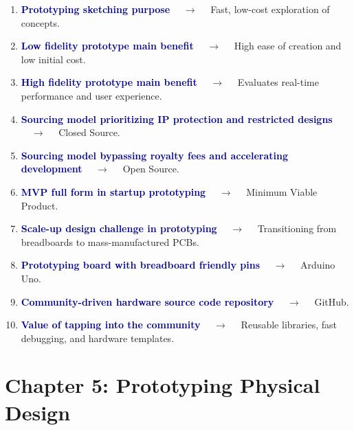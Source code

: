 \documentclass[11pt,a4paper]{article}
\begin{document}
\begin{enumerate}[label=\arabic*., leftmargin=*, labelsep=0.8em, itemsep=0.35em, parsep=0.1em, topsep=0.2em]
  \item \textcolor{darkblue}{\textbf{Prototyping sketching purpose}} $\quad\to\quad$ Fast, low-cost exploration of concepts.
  \item \textcolor{darkblue}{\textbf{Low fidelity prototype main benefit}} $\quad\to\quad$ High ease of creation and low initial cost.
  \item \textcolor{darkblue}{\textbf{High fidelity prototype main benefit}} $\quad\to\quad$ Evaluates real-time performance and user experience.
  \item \textcolor{darkblue}{\textbf{Sourcing model prioritizing IP protection and restricted designs}} $\quad\to\quad$ Closed Source.
  \item \textcolor{darkblue}{\textbf{Sourcing model bypassing royalty fees and accelerating development}} $\quad\to\quad$ Open Source.
  \item \textcolor{darkblue}{\textbf{MVP full form in startup prototyping}} $\quad\to\quad$ Minimum Viable Product.
  \item \textcolor{darkblue}{\textbf{Scale-up design challenge in prototyping}} $\quad\to\quad$ Transitioning from breadboards to mass-manufactured PCBs.
  \item \textcolor{darkblue}{\textbf{Prototyping board with breadboard friendly pins}} $\quad\to\quad$ Arduino Uno.
  \item \textcolor{darkblue}{\textbf{Community-driven hardware source code repository}} $\quad\to\quad$ GitHub.
  \item \textcolor{darkblue}{\textbf{Value of tapping into the community}} $\quad\to\quad$ Reusable libraries, fast debugging, and hardware templates.
\end{enumerate}

\section*{Chapter 5: Prototyping Physical Design}
\end{document}
